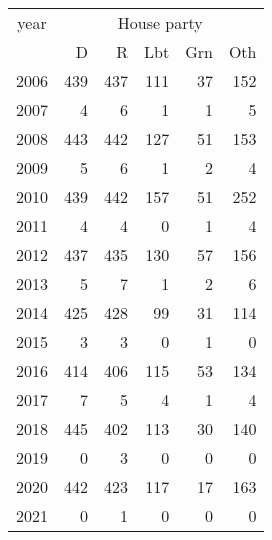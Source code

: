 \footnotesize\begin{tabular}[t]{lrrrrr}
\toprule
\multicolumn{1}{c}{year} & \multicolumn{5}{c}{House party} \\
\cmidrule(l{3pt}r{3pt}){1-1} \cmidrule(l{3pt}r{3pt}){2-6}
  & D & R & Lbt & Grn & Oth\\
\midrule
2006 & 439 & 437 & 111 & 37 & 152\\
2007 & 4 & 6 & 1 & 1 & 5\\
2008 & 443 & 442 & 127 & 51 & 153\\
2009 & 5 & 6 & 1 & 2 & 4\\
2010 & 439 & 442 & 157 & 51 & 252\\
2011 & 4 & 4 & 0 & 1 & 4\\
2012 & 437 & 435 & 130 & 57 & 156\\
2013 & 5 & 7 & 1 & 2 & 6\\
2014 & 425 & 428 & 99 & 31 & 114\\
2015 & 3 & 3 & 0 & 1 & 0\\
2016 & 414 & 406 & 115 & 53 & 134\\
2017 & 7 & 5 & 4 & 1 & 4\\
2018 & 445 & 402 & 113 & 30 & 140\\
2019 & 0 & 3 & 0 & 0 & 0\\
2020 & 442 & 423 & 117 & 17 & 163\\
2021 & 0 & 1 & 0 & 0 & 0\\
\bottomrule
\end{tabular}
